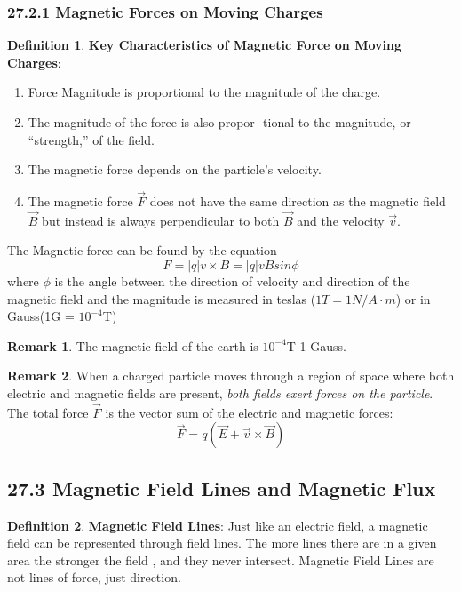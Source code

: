 \documentclass[12pt]{amsart}
\theoremstyle{definition}
\newtheorem{definition}{Definition} %
\newtheorem*{remark}{Remark}        %
\numberwithin{equation}{theorem}    %
\begin{document}
\subsubsection*{27.2.1 Magnetic Forces on Moving Charges}

\begin{definition}
    \textbf{Key Characteristics of Magnetic Force on Moving Charges}:
    \begin{enumerate}
        \item Force Magnitude is proportional to the magnitude of the charge.
        \item The magnitude of the force is also propor- tional to the magnitude, or “strength,” of the field.
        \item The magnetic force depends on the particle’s
        velocity.
        \item The magnetic force $\vec{F}$ does not have the same direction as the magnetic field $\vec{B}$ but instead is always perpendicular to both $\vec{B}$ and the velocity $\vec{v}$. 
    \end{enumerate}
    The Magnetic force can be found by the equation $$F = |q|v \times B = |q|vBsin\phi$$ where $\phi$ is the angle between the direction of velocity and direction of the magnetic field and the magnitude is measured in teslas ($1T = 1N/A \cdot m$) or in Gauss(1G = $10^{-4}$T)
    \begin{remark}
        The magnetic field of the earth is $10^{-4}$T 1 Gauss.
    \end{remark}
\end{definition}

\begin{remark}
    When a charged particle moves through a region of space where both electric and magnetic fields are present, \textit{both fields exert forces on the particle}. The total force $\vec{F}$ is the vector sum of the electric and magnetic forces: $$\vec{F}=q(\vec{E} + \vec{v}\times \vec{B})$$
\end{remark}

\subsection*{27.3 Magnetic Field Lines and Magnetic Flux}

\begin{definition}
    \textbf{Magnetic Field Lines}:
    Just like an electric field, a magnetic field can be represented through field lines. The more lines there are in a given area the stronger the field , and they never intersect. Magnetic Field Lines are not lines of force, just direction.
\end{definition}
\end{document}
